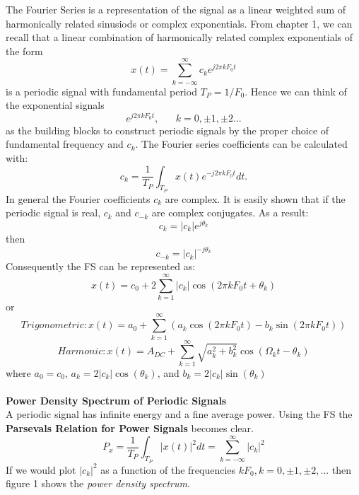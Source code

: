 \documentclass{article} %
\begin{document}
    The Fourier Series is a representation of the signal as a linear weighted sum of harmonically related sinusiods or complex exponentials. From chapter 1, we can recall that a linear combination of harmonically related complex exponentials of the form
    \begin{equation}
 	x(t) = \sum_{k=-\infty}^{\infty}c_ke^{j2\pi kF_0t}     
	\end{equation}
	is a periodic signal with fundamental period $T_P = 1/F_0$. Hence we can think of the exponential signals
	\begin{equation}
 	 {e^{j2\pi kF_0t}, \;\;\;\;\;\; k = 0, \pm 1, \pm 2 ...}
	\end{equation}
	as the building blocks to construct periodic signals by the proper choice of fundamental frequency and $c_k$. The Fourier series coefficients can be calculated with:
	\begin{equation}
 	c_k = \frac{1}{T_P} \int_{T_P} x(t)e^{-j2 \pi kF_0t}dt.
	\end{equation}
	In general the Fourier coefficients $c_k$ are complex. It is easily shown that if the periodic signal is real, $c_k$ and $c_{-k}$ are complex conjugates. As a result:
	\begin{equation}
 	c_k = |c_k|e^{j\theta_{k}}
	\end{equation}
	then
	\begin{equation}
 	c_{-k} = |c_k|^{-j\theta_{k}}
	\end{equation}
	Consequently the FS can be represented as:
	\begin{equation}
 	x(t) = c_0 + 2\sum_{k=1}^{\infty}|c_k|\cos(2\pi k F_0t + \theta_{k})    
	\end{equation}
	or 
	\begin{equation}
 	Trigonometric: x(t) = a_0 + \sum_{k=1}^{\infty}(a_k\cos(2\pi kF_0t) - b_k\sin(2\pi kF_0t))
	\end{equation}
	\begin{equation}
 	Harmonic: x(t) = A_{DC} + \sum_{k=1}^{\infty}\sqrt{a_k^2+b_k^2} \cos(\Omega_{k}t - \theta_{k}) 
	\end{equation}
	where $a_0 = c_0$, $a_k = 2|c_k|\cos(\theta_{k})$, and $b_k = 2|c_k|\sin(\theta_{k})$\\
	\\
	\textbf{Power Density Spectrum of Periodic Signals}\\
	
	A periodic signal has infinite energy and a fine average power. Using the FS the \textbf{Parsevals Relation for Power Signals} becomes clear.
	\begin{equation}
 	P_x = \frac{1}{T_P} \int_{T_P} |x(t)|^2dt = \sum_{k=-\infty}^{\infty} |c_k|^2
	\end{equation}
	If we would plot $|c_k|^2$ as a function of the frequencies $kF_0, k=0,\pm 1, \pm 2,...$ then figure 1 shows the \textit{power density spectrum}.
	
\end{document}
